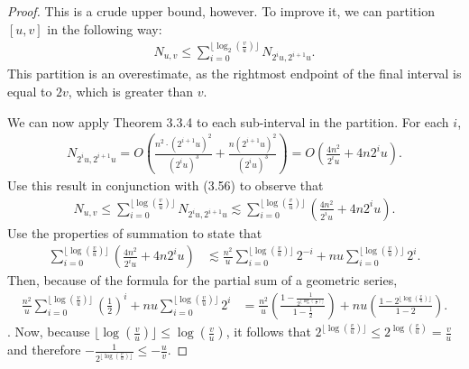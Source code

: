 \documentclass{scrippsthesisclass}
\theoremstyle{definition}
\begin{document}
\begin{proof}
    This is a crude upper bound, however. 
    To improve it, we can partition $[u, v]$ in the following way:
    \begin{align}
    N_{u, v} \leq \sum_{i=0}^{\lfloor \log_2 \left(\frac{v}{u}\right) \rfloor} N_{2^i u, 2^{i+1} u}.
    \end{align}
This partition is an overestimate, as the rightmost endpoint of the final interval is equal to $2v$, which is greater than $v$. 
\begin{center}
\end{center}

We can now apply Theorem 3.3.4 to each sub-interval in the partition. 
For each $i$,
\begin{align}
N_{2^i u, 2^{i+1} u} = O \left(\frac{n^2 \cdot (2^{i+1} u)^2}{(2^i u)^3} + \frac{n(2^{i+1} u)^2}{(2^iu)^3} \right) = O\left(\frac{4n^2}{2^i u} + 4n 2^i u\right).
\end{align}
Use this result in conjunction with (3.56) to observe that
\begin{align}
N_{u, v} \leq \sum_{i=0}^{\lfloor \log \left(\frac{v}{u}\right) \rfloor} N_{2^i u, 2^{i+1} u} \lesssim \sum_{i=0}^{\lfloor \log \left(\frac{v}{u}\right) \rfloor} \left(\frac{4n^2}{2^i u} + 4n2^i u \right).
\end{align}
Use the properties of summation to state that 
\begin{align}
    \sum_{i=0}^{\lfloor \log \left(\frac{v}{u}\right) \rfloor} \left(\frac{4n^2}{2^i u} + 4n2^i u \right) &\lesssim \frac{n^2}{u} \sum_{i=0}^{\lfloor \log \left(\frac{v}{u} \right) \rfloor} 2^{-i} + nu \sum_{i=0}^{\lfloor \log \left(\frac{v}{u} \right) \rfloor} 2^i.
\end{align}
Then, because of the formula for the partial sum of a geometric series,
\begin{align}
    \frac{n^2}{u} \sum_{i=0}^{\lfloor \log \left(\frac{v}{u} \right) \rfloor} \left(\frac{1}{2}\right)^{i} + nu \sum_{i=0}^{\lfloor \log \left(\frac{v}{u} \right)\rfloor} 2^i &= \frac{n^2}{u} \left( \frac{1 - \frac{1}{2^{\lfloor \log \left(\frac{v}{u} \right) \rfloor}}}{1 - \frac{1}{2}} \right) + nu \left(\frac{1 - 2^{\lfloor \log \left(\frac{v}{u} \right)\rfloor}}{1-2}\right).
\end{align}.
Now, because $\lfloor \log \left(\frac{v}{u} \right) \rfloor \leq \log \left(\frac{v}{u} \right)$, it follows that $2^{\lfloor \log \left(\frac{v}{u} \right) \rfloor} \leq 2^{\log \left(\frac{v}{u} \right)} = \frac{v}{u}$ and therefore  $-\frac{1}{2^{\lfloor \log \left(\frac{v}{u} \right) \rfloor}} \leq - \frac{u}{v}$. 


\end{proof}
\end{document}

